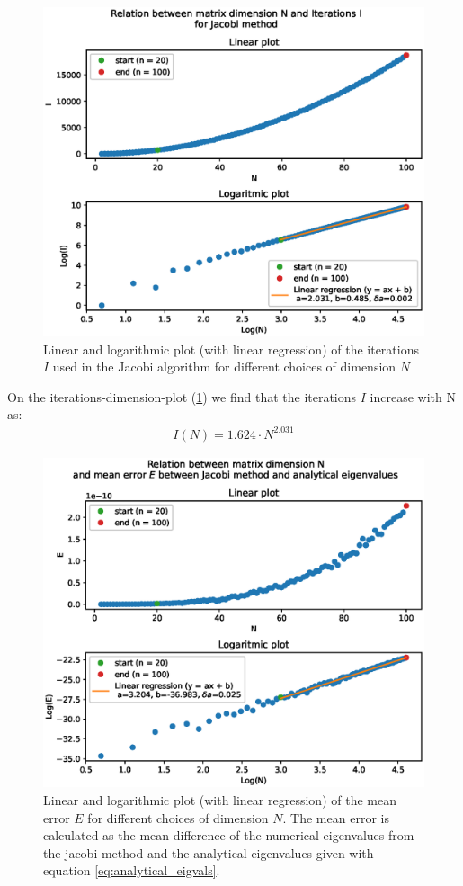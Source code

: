 \documentclass[american,a4paper,12pt]{article}
\begin{document}
\begin{figure}[H]
    \centering
    \includegraphics[width = \textwidth]{figures/iter_dim_jacobi.eps}
    \caption{Linear and logarithmic plot (with linear regression) of the iterations $I$ used in the Jacobi algorithm for different choices of dimension $N$}
    \label{fig:iter_dim_jacobi}
\end{figure}
On the iterations-dimension-plot (\ref{fig:iter_dim_jacobi}) we find that the iterations $I$ increase with N as:
\begin{align*}
    I(N) = 1.624 \cdot N^{2.031}
\end{align*}
\begin{figure}[H]
    \centering
    \includegraphics[width = \textwidth]{figures/error_dim_jacobi.eps}
    \caption{Linear and logarithmic plot (with linear regression) of the mean error $E$ for different choices of dimension $N$. The mean error is calculated as the mean difference of the numerical eigenvalues from the jacobi method and the analytical eigenvalues given with equation \ref{eq:analytical_eigvals}.}
    \label{fig:error_dim_jacobi}
\end{figure}
\end{document}
